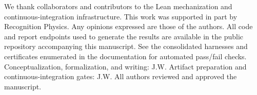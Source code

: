\documentclass[aps,prd,twocolumn,superscriptaddress,nofootinbib,floatfix,longbibliography]{revtex4-2}
\begin{document}
%
We thank collaborators and contributors to the Lean mechanization and continuous-integration infrastructure. This work was supported in part by Recognition Physics. Any opinions expressed are those of the authors.
%
All code and report endpoints used to generate the results are available in the public repository accompanying this manuscript. See the consolidated harnesses and certificates enumerated in the documentation for automated pass/fail checks.
%
Conceptualization, formalization, and writing: J.W. Artifact preparation and continuous-integration gates: J.W. All authors reviewed and approved the manuscript.
%


\end{document}
